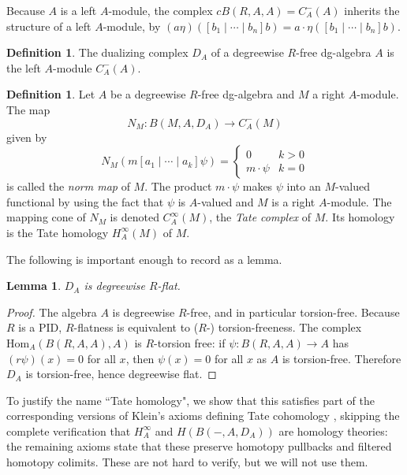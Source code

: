 \documentclass{memo-l}
\newtheorem{lemma}[theorem]{Lemma}
\theoremstyle{definition}
\newtheorem{definition}[theorem]{Definition}
\theoremstyle{remark}
\numberwithin{section}{chapter}
\numberwithin{equation}{chapter}
\begin{document}
Because $A$ is a left $A$-module, the complex $cB(R, A, A) = C^-_A(A)$ inherits the structure of a left $A$-module, by $(a\eta)([b_1 \mid \cdots \mid b_n]b) = a\cdot \eta([b_1 \mid \cdots \mid b_n]b)$.

\begin{definition}The dualizing complex $D_A$ of a degreewise $R$-free dg-algebra $A$ is the left $A$-module $C^-_A(A)$.\end{definition}

\begin{definition}\label{tate-def}Let $A$ be a degreewise $R$-free dg-algebra and $M$ a right $A$-module. The map $$N_M: B(M, A, D_A) \to C^-_A(M)$$ given by 
\[ N_M\left(m[a_1 \mid \cdots \mid a_k] \psi\right) = \begin{cases} 
      0 & k > 0 \\
      m \cdot \psi & k = 0
   \end{cases}
\] 
is called the \textit{norm map} of $M$. The product $m \cdot \psi$ makes $\psi$ into an $M$-valued functional by using the fact that $\psi$ is $A$-valued and $M$ is a right $A$-module. The mapping cone of $N_M$ is denoted $C^\infty_A(M)$, the \textit{Tate complex} of $M$. Its homology is the Tate homology $H^\infty_A(M)$ of $M$.
\end{definition}

The following is important enough to record as a lemma.
\begin{lemma}\label{flatcheck}$D_A$ is degreewise $R$-flat.\end{lemma}
\begin{proof}
The algebra $A$ is degreewise $R$-free, and in particular torsion-free. Because $R$ is a PID, $R$-flatness is equivalent to ($R$-) torsion-freeness. The complex $\text{Hom}_A(B(R,A,A), A)$ is $R$-torsion free: if $\psi: B(R,A,A) \to A$ has $(r \psi)(x) = 0$ for all $x$, then $\psi(x) = 0$ for all $x$ as $A$ is torsion-free. Therefore $D_A$ is torsion-free, hence degreewise flat. 
\end{proof}

To justify the name ``Tate homology", we show that this satisfies part of the corresponding versions of Klein's axioms defining Tate cohomology \cite{Klein}, skipping the complete verification that $H^\infty_A$ and $H\left(B(-, A, D_A)\right)$ are homology theories: the remaining axioms state that these preserve homotopy pullbacks and filtered homotopy colimits. These are not hard to verify, but we will not use them. 
\end{document}
